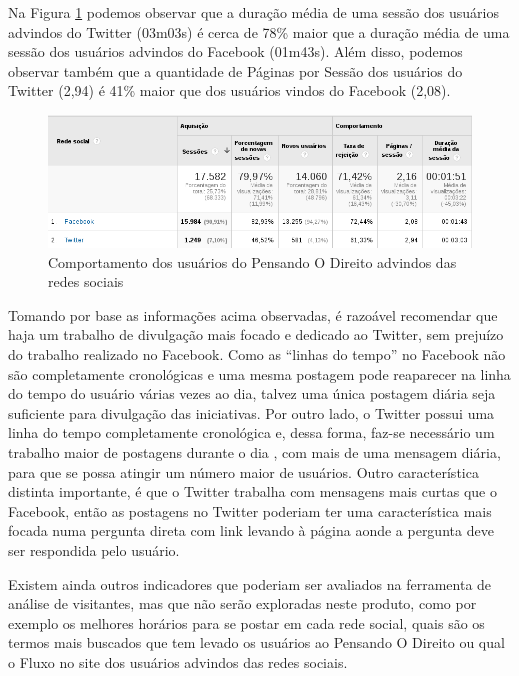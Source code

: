 Na Figura \ref{fig:comportamento-redes-sociais} podemos observar que a duração média de uma sessão dos usuários advindos do Twitter (03m03s) é cerca de 78\% maior que a duração média de uma sessão dos usuários advindos do Facebook (01m43s). Além disso, podemos observar também que a quantidade de Páginas por Sessão dos usuários do Twitter (2,94) é 41\% maior que dos usuários vindos do Facebook (2,08).

\begin{figure}[htb]%
	\begin{center}
		\includegraphics[scale=0.55]{./imagens/comportamento-social.png}%
	\end{center}%
	\caption{Comportamento dos usuários do Pensando O Direito advindos das redes sociais\label{fig:comportamento-redes-sociais}}%
\end{figure}%

Tomando por base as informações acima observadas, é razoável recomendar que haja um trabalho de divulgação mais focado e dedicado ao Twitter, sem prejuízo do trabalho realizado no Facebook. Como as ``linhas do tempo'' no Facebook não são completamente cronológicas e uma mesma postagem pode reaparecer na linha do tempo do usuário várias vezes ao dia, talvez uma única postagem diária seja suficiente para divulgação das iniciativas. Por outro lado, o Twitter possui uma linha do tempo completamente cronológica e, dessa forma, faz-se necessário um trabalho maior de postagens durante o dia \cite{killeen}, com mais de uma mensagem diária, para que se possa atingir um número maior de usuários. Outro característica distinta importante, é que o Twitter trabalha com mensagens mais curtas que o Facebook, então as postagens no Twitter poderiam ter uma característica mais focada numa pergunta direta com link levando à página aonde a pergunta deve ser respondida pelo usuário.

Existem ainda outros indicadores que poderiam ser avaliados na ferramenta de análise de visitantes, mas que não serão exploradas neste produto, como por exemplo os melhores horários para se postar em cada rede social, quais são os termos mais buscados que tem levado os usuários ao Pensando O Direito ou qual o Fluxo no site dos usuários advindos das redes sociais.

